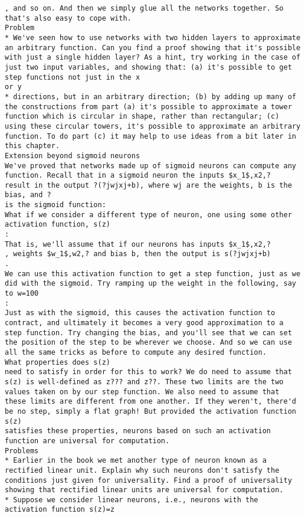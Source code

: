 \begin{lstlisting}
, and so on. And then we simply glue all the networks together. So that's also easy to cope with.
Problem
* We've seen how to use networks with two hidden layers to approximate an arbitrary function. Can you find a proof showing that it's possible with just a single hidden layer? As a hint, try working in the case of just two input variables, and showing that: (a) it's possible to get step functions not just in the x
or y
* directions, but in an arbitrary direction; (b) by adding up many of the constructions from part (a) it's possible to approximate a tower function which is circular in shape, rather than rectangular; (c) using these circular towers, it's possible to approximate an arbitrary function. To do part (c) it may help to use ideas from a bit later in this chapter.
Extension beyond sigmoid neurons
We've proved that networks made up of sigmoid neurons can compute any function. Recall that in a sigmoid neuron the inputs $x_1$,x2,?
result in the output ?(?jwjxj+b), where wj are the weights, b is the bias, and ?
is the sigmoid function:
What if we consider a different type of neuron, one using some other activation function, s(z)
:
That is, we'll assume that if our neurons has inputs $x_1$,x2,?
, weights $w_1$,w2,? and bias b, then the output is s(?jwjxj+b)
.
We can use this activation function to get a step function, just as we did with the sigmoid. Try ramping up the weight in the following, say to w=100
:
Just as with the sigmoid, this causes the activation function to contract, and ultimately it becomes a very good approximation to a step function. Try changing the bias, and you'll see that we can set the position of the step to be wherever we choose. And so we can use all the same tricks as before to compute any desired function.
What properties does s(z)
need to satisfy in order for this to work? We do need to assume that s(z) is well-defined as z??? and z??. These two limits are the two values taken on by our step function. We also need to assume that these limits are different from one another. If they weren't, there'd be no step, simply a flat graph! But provided the activation function s(z)
satisfies these properties, neurons based on such an activation function are universal for computation.
Problems
* Earlier in the book we met another type of neuron known as a rectified linear unit. Explain why such neurons don't satisfy the conditions just given for universality. Find a proof of universality showing that rectified linear units are universal for computation.
* Suppose we consider linear neurons, i.e., neurons with the activation function s(z)=z

\end{lstlisting}
